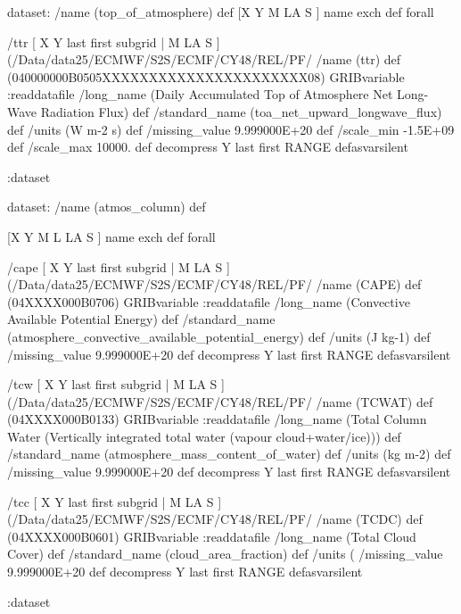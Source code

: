 \begin{ingrid}

dataset:
/name (top_of_atmosphere) def
[X Y M LA S ] {name exch def } forall

/ttr { [ X Y last first subgrid | M LA S ] (/Data/data25/ECMWF/S2S/ECMF/CY48/REL/PF/%
/name (ttr) def
(040000000B0505XXXXXXXXXXXXXXXXXXXXXX08) GRIBvariable
:readdatafile
/long_name (Daily Accumulated Top of Atmosphere Net Long-Wave Radiation Flux) def
/standard_name (toa_net_upward_longwave_flux) def
/units (W m-2 s) def
/missing_value 9.999000E+20 def
/scale_min -1.5E+09 def
/scale_max 10000. def
decompress
Y last first RANGE
} defasvarsilent

:dataset

dataset:
/name (atmos_column) def

[X Y M L LA S ] {name exch def } forall


/cape { [ X Y last first subgrid | M LA S ] (/Data/data25/ECMWF/S2S/ECMF/CY48/REL/PF/%
/name (CAPE) def
(04XXXX000B0706) GRIBvariable
:readdatafile
/long_name (Convective Available Potential Energy) def
/standard_name (atmosphere_convective_available_potential_energy) def
/units (J kg-1) def
/missing_value 9.999000E+20 def
decompress
Y last first RANGE
} defasvarsilent


/tcw { [ X Y last first subgrid | M LA S ] (/Data/data25/ECMWF/S2S/ECMF/CY48/REL/PF/%
/name (TCWAT) def
(04XXXX000B0133) GRIBvariable
:readdatafile
/long_name (Total Column Water (Vertically integrated total water (vapour cloud+water/ice))) def
/standard_name (atmosphere_mass_content_of_water) def
/units (kg m-2) def
/missing_value 9.999000E+20 def
decompress
Y last first RANGE
} defasvarsilent


/tcc { [ X Y last first subgrid | M LA S ] (/Data/data25/ECMWF/S2S/ECMF/CY48/REL/PF/%
/name (TCDC) def
(04XXXX000B0601) GRIBvariable
:readdatafile
/long_name (Total Cloud Cover) def
/standard_name (cloud_area_fraction) def
/units (%
/missing_value 9.999000E+20 def
decompress
Y last first RANGE
} defasvarsilent

:dataset

\end{ingrid}
